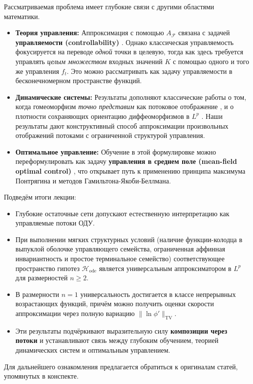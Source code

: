 \documentclass[../NDCNNAI_main.tex]{subfiles}
\begin{document}
Рассматриваемая проблема имеет глубокие связи с другими областями математики.
\begin{itemize}
    \item \textbf{Теория управления:} Аппроксимация с помощью $A_{\mathcal{F}}$ связана с задачей \textbf{управляемости (controllability)} \cite{Sussmann1990NonlinearControllability, Balachandran2002ControllabilitySurvey, Chukwu1991ControllabilityAbstract}. Однако классическая управляемость фокусируется на переводе \emph{одной} точки в целевую, тогда как здесь требуется управлять \emph{целым множеством} входных значений $K$ с помощью одного и того же управления $f_t$. Это можно рассматривать как задачу управляемости в бесконечномерном пространстве функций.
    \item \textbf{Динамические системы:} Результаты дополняют классические работы о том, когда гомеоморфизм \emph{точно представим} как потоковое отображение \cite{Fort1955EmbeddingHomeomorphisms, Utz1981EmbeddingHomeomorphisms, Zhang2009EmbeddingDiffeomorphisms}, и о плотности сохраняющих ориентацию диффеоморфизмов в $L^p$ \cite{Brenier2003LpApproximation}. Наши результаты дают конструктивный способ аппроксимации произвольных отображений потоками с ограниченной структурой управления.
    \item \textbf{Оптимальное управление:} Обучение в этой формулировке можно переформулировать как задачу \textbf{управления в среднем поле (mean-field optimal control)} \cite{E2019MeanFieldOptimalControl, Li2017MaximumPrinciple}, что открывает путь к применению принципа максимума Понтрягина и методов Гамильтона-Якоби-Беллмана.
\end{itemize}

Подведём итоги лекции:
\begin{itemize}
    \item Глубокие остаточные сети допускают естественную интерпретацию как управляемые потоки ОДУ.
    \item При выполнении мягких структурных условий (наличие функции-колодца в выпуклой оболочке управляющего семейства, ограниченная аффинная инвариантность и простое терминальное семейство) соответствующее пространство гипотез $\mathcal{H}_{\text{ode}}$ является универсальным аппроксиматором в $L^p$ для размерностей $n \geq 2$.
    \item В размерности $n=1$ универсальность достигается в классе непрерывных возрастающих функций, причём можно получить оценки скорости аппроксимации через полную вариацию $\| \ln \phi' \|_{\mathrm{TV}}$.
    \item Эти результаты подчёркивают выразительную силу \textbf{композиции через потоки} и устанавливают связь между глубоким обучением, теорией динамических систем и оптимальным управлением.
\end{itemize}
Для дальнейшего ознакомления предлагается обратиться к оригиналам статей, упомянутых в конспекте.
\end{document}
